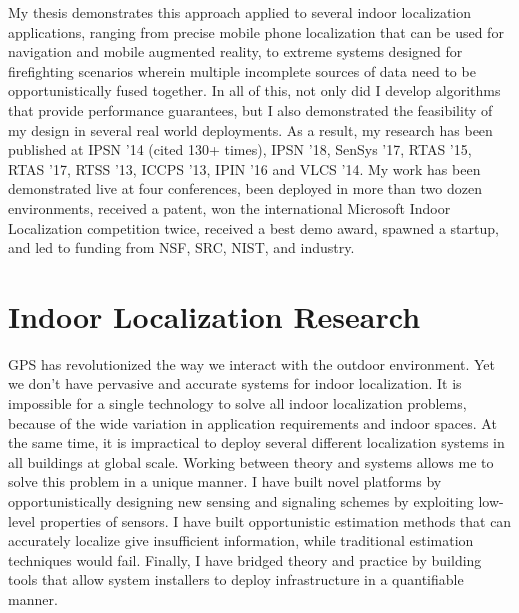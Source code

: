 \documentclass[10pt]{article}
\begin{document}
My thesis demonstrates this approach applied to several indoor localization applications, ranging from precise mobile phone localization that can be used for navigation and mobile augmented reality, to extreme systems designed for firefighting scenarios wherein multiple incomplete sources of data need to be opportunistically fused together. 
In all of this, not only did I develop algorithms that provide performance guarantees, but I also demonstrated the feasibility of my design in several real world deployments.
As a result, my research has been published at IPSN '14 (cited 130+ times), IPSN '18, SenSys '17, RTAS '15, RTAS '17, RTSS '13, ICCPS '13, IPIN '16 and VLCS '14. My work has been demonstrated live at four conferences, been deployed in more than two dozen environments, received a patent, won the international Microsoft Indoor Localization competition twice, received a best demo award, spawned a startup, and led to funding from NSF, SRC, NIST, and industry.



\section{Indoor Localization Research}

GPS has revolutionized the way we interact with the outdoor environment.  %
Yet we don't have pervasive and accurate systems for indoor localization.  
It is impossible for a single technology to solve all indoor localization problems, because of the wide variation in application requirements and indoor spaces.  At the same time, it is impractical to deploy several different localization systems in all buildings at global scale. %
Working between theory and systems allows me to solve this problem in a unique manner. I have built novel platforms by opportunistically designing new sensing and signaling schemes by exploiting low-level properties of sensors. I have built opportunistic estimation methods that can accurately localize give insufficient information, while traditional estimation techniques would fail. Finally, I have bridged theory and practice by building tools that  allow system installers to deploy infrastructure in a quantifiable manner. 
\end{document}
